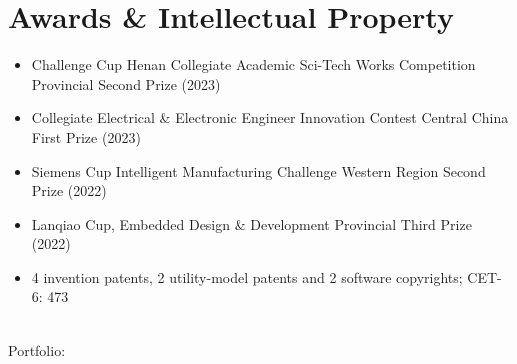 \documentclass{resume-photo}
\begin{document}
\section{Awards \& Intellectual Property}
\begin{itemize}
  \item Challenge Cup Henan Collegiate Academic Sci-Tech Works Competition \hfill Provincial Second Prize (2023)
  \item Collegiate Electrical \& Electronic Engineer Innovation Contest \hfill Central China First Prize (2023)
  \item Siemens Cup Intelligent Manufacturing Challenge \hfill Western Region Second Prize (2022)
  \item Lanqiao Cup, Embedded Design \& Development \hfill Provincial Third Prize (2022)
  \item 4 invention patents, 2 utility-model patents and 2 software copyrights; CET-6: 473
\end{itemize}

\vfill
\begin{center}
  \\[4pt]
  {\footnotesize Portfolio: }
\end{center}
\end{document}
